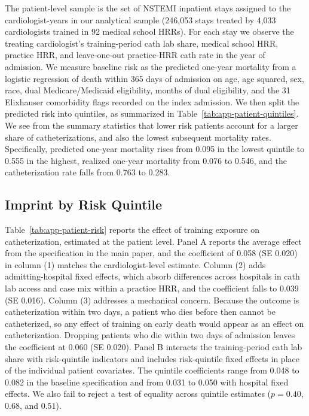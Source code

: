 \documentclass[12pt]{article}
\begin{document}
The patient-level sample is the set of NSTEMI inpatient stays assigned to the cardiologist-years in our analytical sample (246,053 stays treated by 4,033 cardiologists trained in 92 medical school HRRs). For each stay we observe the treating cardiologist's training-period cath lab share, medical school HRR, practice HRR, and leave-one-out practice-HRR cath rate in the year of admission. We measure baseline risk as the predicted one-year mortality from a logistic regression of death within 365 days of admission on age, age squared, sex, race, dual Medicare/Medicaid eligibility, months of dual eligibility, and the 31 Elixhauser comorbidity flags recorded on the index admission. We then split the predicted risk into quintiles, as summarized in Table~\ref{tab:app-patient-quintiles}. We see from the summary statistics that lower risk patients account for a larger share of catheterizations, and also the lowest subsequent mortality rates. Specifically, predicted one-year mortality rises from 0.095 in the lowest quintile to 0.555 in the highest, realized one-year mortality from 0.076 to 0.546, and the catheterization rate falls from 0.763 to 0.283.

\subsection{Imprint by Risk Quintile}

Table~\ref{tab:app-patient-risk} reports the effect of training exposure on catheterization, estimated at the patient level. Panel A reports the average effect from the specification in the main paper, and the coefficient of 0.058 (SE 0.020) in column (1) matches the cardiologist-level estimate. Column (2) adds admitting-hospital fixed effects, which absorb differences across hospitals in cath lab access and case mix within a practice HRR, and the coefficient falls to 0.039 (SE 0.016). Column (3) addresses a mechanical concern. Because the outcome is catheterization within two days, a patient who dies before then cannot be catheterized, so any effect of training on early death would appear as an effect on catheterization. Dropping patients who die within two days of admission leaves the coefficient at 0.060 (SE 0.020). Panel B interacts the training-period cath lab share with risk-quintile indicators and includes risk-quintile fixed effects in place of the individual patient covariates. The quintile coefficients range from 0.048 to 0.082 in the baseline specification and from 0.031 to 0.050 with hospital fixed effects. We also fail to reject a test of equality across quintile estimates ($p = 0.40$, $0.68$, and $0.51$).
\end{document}
